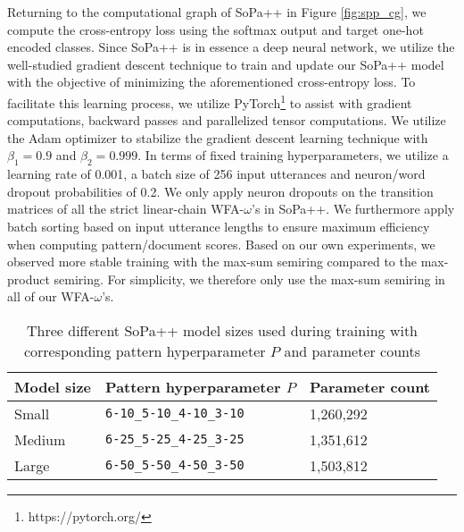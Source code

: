 Returning to the computational graph of SoPa++ in Figure \ref{fig:spp_cg}, we
compute the cross-entropy loss using the softmax output and target one-hot
encoded classes. Since SoPa++ is in essence a deep neural network, we utilize
the well-studied gradient descent technique to train and update our SoPa++ model
with the objective of minimizing the aforementioned cross-entropy loss. To
facilitate this learning process, we utilize
PyTorch\footnote{https://pytorch.org/} to assist with gradient computations,
backward passes and parallelized tensor computations. We utilize the Adam
optimizer \citep{DBLP:journals/corr/KingmaB14} to stabilize the gradient descent
learning technique with $\beta_1=0.9$ and $\beta_2=0.999$. In terms of fixed
training hyperparameters, we utilize a learning rate of 0.001, a batch size of
256 input utterances and neuron/word dropout probabilities of 0.2. We only apply
neuron dropouts on the transition matrices of all the strict linear-chain
WFA-$\omega$'s in SoPa++. We furthermore apply batch sorting based on input
utterance lengths to ensure maximum efficiency when computing pattern/document
scores. Based on our own experiments, we observed more stable training with the
max-sum semiring compared to the max-product semiring. For simplicity, we
therefore only use the max-sum semiring in all of our WFA-$\omega$'s.

\begin{table}[t!]
  \centering
  \begin{tabular}{lll}
    \toprule
    Model size & Pattern hyperparameter $P$ & Parameter count \\
    \midrule
    Small & \texttt{6-10\_5-10\_4-10\_3-10} & 1,260,292 \\
    Medium & \texttt{6-25\_5-25\_4-25\_3-25} & 1,351,612  \\
    Large & \texttt{6-50\_5-50\_4-50\_3-50} & 1,503,812 \\
    \bottomrule
  \end{tabular}
  \caption{Three different SoPa++ model sizes used during training with
    corresponding pattern hyperparameter $P$ and parameter counts}
  \label{tab:model_types}
\end{table}

